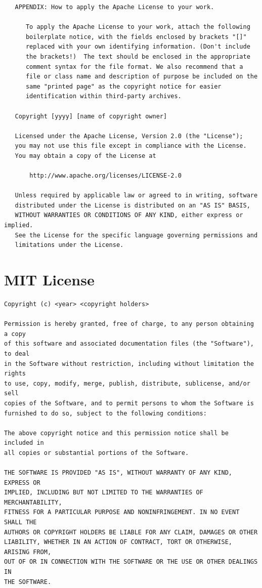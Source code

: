 \documentclass[10pt, headsepline,DIV14,BCOR0.5cm]{scrreprt}
\begin{document}
\begin{lstlisting}
   APPENDIX: How to apply the Apache License to your work.

      To apply the Apache License to your work, attach the following
      boilerplate notice, with the fields enclosed by brackets "[]"
      replaced with your own identifying information. (Don't include
      the brackets!)  The text should be enclosed in the appropriate
      comment syntax for the file format. We also recommend that a
      file or class name and description of purpose be included on the
      same "printed page" as the copyright notice for easier
      identification within third-party archives.

   Copyright [yyyy] [name of copyright owner]

   Licensed under the Apache License, Version 2.0 (the "License");
   you may not use this file except in compliance with the License.
   You may obtain a copy of the License at

       http://www.apache.org/licenses/LICENSE-2.0

   Unless required by applicable law or agreed to in writing, software
   distributed under the License is distributed on an "AS IS" BASIS,
   WITHOUT WARRANTIES OR CONDITIONS OF ANY KIND, either express or implied.
   See the License for the specific language governing permissions and
   limitations under the License.
\end{lstlisting}

\section{MIT License}

\begin{lstlisting}
Copyright (c) <year> <copyright holders>

Permission is hereby granted, free of charge, to any person obtaining a copy
of this software and associated documentation files (the "Software"), to deal
in the Software without restriction, including without limitation the rights
to use, copy, modify, merge, publish, distribute, sublicense, and/or sell
copies of the Software, and to permit persons to whom the Software is
furnished to do so, subject to the following conditions:

The above copyright notice and this permission notice shall be included in
all copies or substantial portions of the Software.

THE SOFTWARE IS PROVIDED "AS IS", WITHOUT WARRANTY OF ANY KIND, EXPRESS OR
IMPLIED, INCLUDING BUT NOT LIMITED TO THE WARRANTIES OF MERCHANTABILITY,
FITNESS FOR A PARTICULAR PURPOSE AND NONINFRINGEMENT. IN NO EVENT SHALL THE
AUTHORS OR COPYRIGHT HOLDERS BE LIABLE FOR ANY CLAIM, DAMAGES OR OTHER
LIABILITY, WHETHER IN AN ACTION OF CONTRACT, TORT OR OTHERWISE, ARISING FROM,
OUT OF OR IN CONNECTION WITH THE SOFTWARE OR THE USE OR OTHER DEALINGS IN
THE SOFTWARE.
\end{lstlisting}
\end{document}
